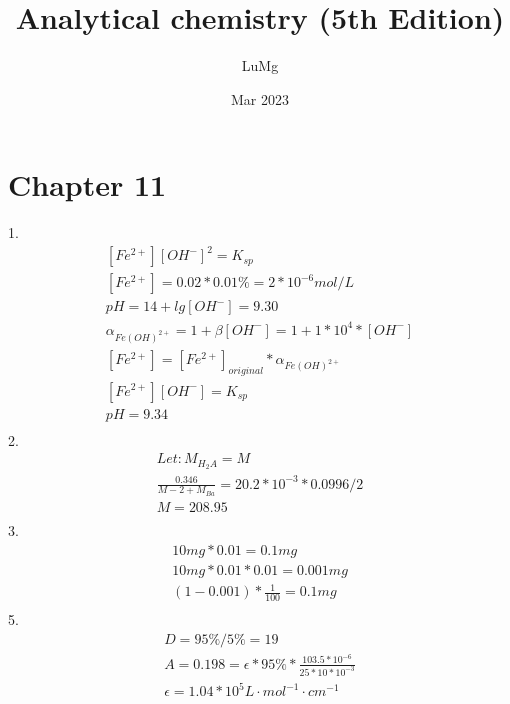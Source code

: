 \documentclass{article}
\title{Analytical chemistry (5th Edition)}
\author{LuMg}
\date{Mar 2023}
\begin{document}
\maketitle

\section{Chapter 11}
1.\begin{equation}
    \begin{multlined}
        [Fe^{2+}][OH^-]^2 = K_{sp}\\
        [Fe^{2+}] = 0.02 * 0.01\% = 2*10^{-6} mol/L\\
        pH = 14 + lg[OH^-] = 9.30\\
        \alpha_{Fe(OH)^{2+}} = 1 + \beta[OH^-] = 1 + 1*10^4*[OH^-]\\
        [Fe^{2+}] = [Fe^{2+}]_{original}*\alpha_{Fe(OH)^{2+}}\\
        [Fe^{2+}][OH^-] = K_{sp}\\
        pH = 9.34\\
    \end{multlined}
\end{equation}
2.\begin{equation}
    \begin{multlined}
        Let:
        M_{H_2A} = M\\
        \frac{0.346}{M - 2 + M_{Ba}} = 20.2*10^{-3}*0.0996/2\\
        M = 208.95\\
    \end{multlined}
\end{equation}
3.\begin{equation}
    \begin{multlined}
        10mg*0.01 = 0.1mg\\
        10mg*0.01*0.01 = 0.001mg\\
        (1 - 0.001)*\frac{1}{100} = 0.1mg\\
    \end{multlined}
\end{equation}
5.\begin{equation}
    \begin{multlined}
        D = 95\%/5\% = 19\\
        A = 0.198 = \epsilon*95\%*\frac{103.5*10^{-6}}{25*10*10^{-3}}\\
        \epsilon = 1.04*10^5 L\cdot mol^{-1}\cdot cm^{-1}\\
    \end{multlined}
\end{equation}
\end{document}
